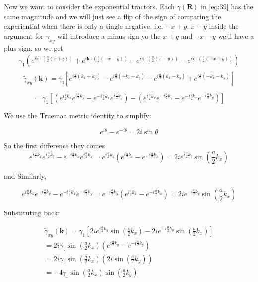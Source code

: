\documentclass{article}
\begin{document}
Now we want to consider the exponential tractors. Each $\gamma(\mathbf{R})$ in \ref{eq:39} has the same magnitude and we will just see a flip of the sign of comparing the experiential when there is only a single negative, i.e. $-x+y$, $x-y$ inside the argument for $\gamma _{xy}$ will introduce a minus sign yo the $x+y$ and $-x-y$ we'll have a plus sign, so we get
\begin{align}
    \gamma_1\left(e^{i \mathbf{k} \cdot \left(\frac{a}{2}\left(x+y\right)\right)} + e^{i \mathbf{k} \cdot \left(\frac{a}{2}\left(-x-y\right)\right)} - e^{i \mathbf{k} \cdot \left(\frac{a}{2}\left(x-y\right)\right)} - e^{i \mathbf{k} \cdot \left(\frac{a}{2}\left(-x+y\right)\right)}\right)\\
\end{align}
\[
\tilde{\gamma}_{xy}(\mathbf{k}) = \gamma_1 \left[ e^{i \frac{a}{2}(k_x + k_y)} - e^{i \frac{a}{2}(-k_x + k_y)} - e^{i \frac{a}{2}(k_x - k_y)} + e^{i \frac{a}{2}(-k_x - k_y)} \right]
\]

\[
= \gamma_1 \left[ \left( e^{i \frac{a}{2}k_x} e^{i \frac{a}{2}k_y} - e^{-i \frac{a}{2}k_x} e^{i \frac{a}{2}k_y} \right) - \left( e^{i \frac{a}{2}k_x} e^{-i \frac{a}{2}k_y} - e^{-i \frac{a}{2}k_x} e^{-i \frac{a}{2}k_y} \right) \right]
\]

We use the Trueman metric identity to simplify:

\begin{equation}
    e^{i\theta} - e^{-i\theta} = 2i \sin \theta
\end{equation}

So the first difference they comes
\begin{equation}
    e^{i \frac{a}{2}k_x} e^{i \frac{a}{2}k_y} - e^{-i \frac{a}{2}k_x} e^{i \frac{a}{2}k_y} = e^{i \frac{a}{2}k_y} \left( e^{i \frac{a}{2}k_x} - e^{-i \frac{a}{2}k_x} \right) = 2i e^{i \frac{a}{2}k_y} \sin\left( \frac{a}{2}k_x \right)
\end{equation}

and Similarly,

\begin{equation}
    e^{i \frac{a}{2}k_x} e^{-i \frac{a}{2}k_y} - e^{-i \frac{a}{2}k_x} e^{-i \frac{a}{2}k_y} = e^{-i \frac{a}{2}k_y} \left( e^{i \frac{a}{2}k_x} - e^{-i \frac{a}{2}k_x} \right) = 2i e^{-i \frac{a}{2}k_y} \sin\left( \frac{a}{2}k_x \right)
\end{equation}

Substituting back:

\begin{align}
    \tilde{\gamma}_{xy}(\mathbf{k}) = \gamma_1 \left[ 2i e^{i \frac{a}{2}k_y} \sin\left( \frac{a}{2}k_x \right) - 2i e^{-i \frac{a}{2}k_y} \sin\left( \frac{a}{2}k_x \right) \right]\\
    = 2i \gamma_1 \sin\left( \frac{a}{2}k_x \right) \left( e^{i \frac{a}{2}k_y} - e^{-i \frac{a}{2}k_y} \right) \\
    = 2i \gamma_1 \sin\left( \frac{a}{2}k_x \right) \left( 2i \sin\left( \frac{a}{2}k_y \right) \right) \\
    = -4 \gamma_1 \sin\left( \frac{a}{2}k_x \right) \sin\left( \frac{a}{2}k_y \right)
\end{align}
\end{document}
